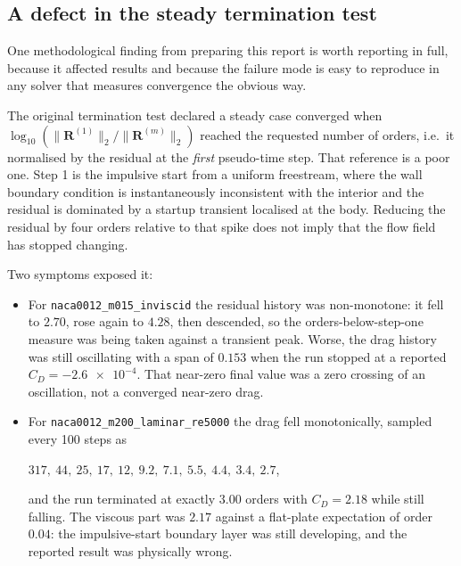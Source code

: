 \subsection{A defect in the steady termination test}
\label{sec:stationarity}

One methodological finding from preparing this report is worth reporting in full,
because it affected results and because the failure mode is easy to reproduce in
any solver that measures convergence the obvious way.

The original termination test declared a steady case converged when
$\log_{10}\left(\|\mathbf{R}^{(1)}\|_2/\|\mathbf{R}^{(m)}\|_2\right)$ reached the
requested number of orders, i.e.\ it normalised by the residual at the
\emph{first} pseudo-time step. That reference is a poor one. Step 1 is the
impulsive start from a uniform freestream, where the wall boundary condition is
instantaneously inconsistent with the interior and the residual is dominated by a
startup transient localised at the body. Reducing the residual by four orders
relative to that spike does not imply that the flow field has stopped changing.

Two symptoms exposed it:

\begin{itemize}
  \item For \texttt{naca0012\_m015\_inviscid} the residual history was
  non-monotone: it fell to $2.70$, rose again to $4.28$, then descended, so the
  orders-below-step-one measure was being taken against a transient peak. Worse,
  the drag history was still oscillating with a span of $0.153$ when the run
  stopped at a reported $C_D=\num{-2.6e-4}$. That near-zero final value was a
  zero crossing of an oscillation, not a converged near-zero drag.
  \item For \texttt{naca0012\_m200\_laminar\_re5000} the drag fell monotonically,
  sampled every 100 steps as
  \begin{center}
    $317,\ 44,\ 25,\ 17,\ 12,\ 9.2,\ 7.1,\ 5.5,\ 4.4,\ 3.4,\ 2.7$,
  \end{center}
  and the run terminated at exactly $3.00$ orders with $C_D=2.18$ while still
  falling. The viscous part was $2.17$ against a flat-plate expectation of order
  $0.04$: the impulsive-start boundary layer was still developing, and the reported
  result was physically wrong.
\end{itemize}

